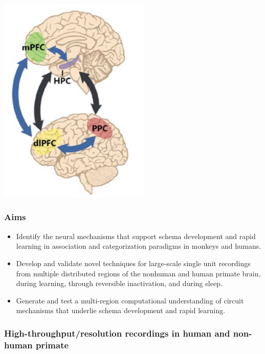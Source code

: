 \documentclass[a0, landscape]{a0poster}
\begin{document}
\begin{multicols}{3}
\begin{minipage}[b]{1\linewidth}
\begin{minipage}[]{0.3\linewidth}
\includegraphics[height=10cm]{circuit-diagram.png}
\end{minipage}
\hfill
\end{minipage}

\subsubsection*{Aims}
\begin{itemize}
\item Identify the neural mechanisms that support schema development and rapid learning in association and categorization paradigms in monkeys and humans.

\item Develop and validate novel techniques for large-scale single unit recordings from multiple distributed regions of the nonhuman and human primate brain, during learning, through reversible inactivation, and during sleep.

\item Generate and test a multi-region computational understanding of circuit mechanisms that underlie schema development and rapid learning.

\end{itemize}


\subsubsection*{High-throughput/resolution recordings in human and non-human primate}


\end{multicols}
\end{document}
